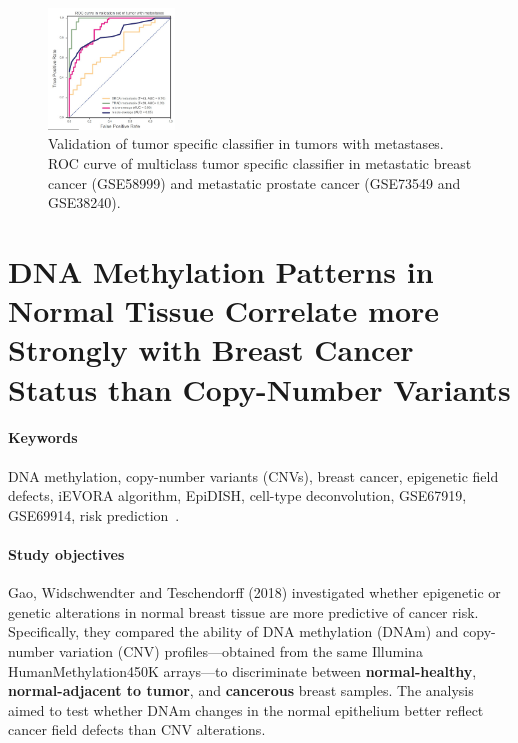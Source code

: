 \documentclass[10pt]{extarticle}
\begin{document}
\begin{figure}[h]
    \centering
    \includegraphics[width=0.3\textwidth]{Figures/Validation of tumor specific classifier in tumors with metastases.jpg} %
    \caption{Validation of tumor specific classifier in tumors with metastases. ROC curve of multiclass tumor specific classifier in
metastatic breast cancer (GSE58999) and metastatic prostate cancer (GSE73549 and GSE38240).}
    \label{fig:ROC}
\end{figure}

\section{DNA Methylation Patterns in Normal Tissue Correlate more Strongly with Breast Cancer Status than Copy-Number Variants}

\paragraph{Keywords}
DNA methylation, copy-number variants (CNVs), breast cancer, epigenetic field defects, iEVORA algorithm, EpiDISH, cell-type deconvolution, GSE67919, GSE69914, risk prediction~\cite{gao2018dnamethylation}.

\paragraph{Study objectives}
Gao, Widschwendter and Teschendorff (2018) investigated whether epigenetic or genetic alterations in normal breast tissue are more predictive of cancer risk. Specifically, they compared the ability of DNA methylation (DNAm) and copy-number variation (CNV) profiles—obtained from the same Illumina HumanMethylation450K arrays—to discriminate between \textbf{normal-healthy}, \textbf{normal-adjacent to tumor}, and \textbf{cancerous} breast samples. The analysis aimed to test whether DNAm changes in the normal epithelium better reflect cancer field defects than CNV alterations.
\end{document}
